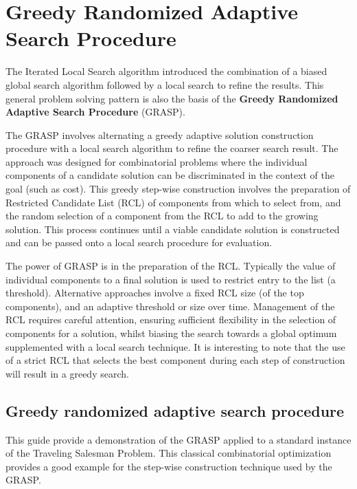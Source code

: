 \section{Greedy Randomized Adaptive Search Procedure}
The Iterated Local Search algorithm introduced the combination of a biased global search algorithm followed by a local search to refine the results. This general problem solving pattern is also the basis of the \textbf{Greedy Randomized Adaptive Search Procedure} (GRASP).

The GRASP involves alternating a greedy adaptive solution construction procedure with a local search algorithm to refine the coarser search result. The approach was designed for combinatorial problems where the individual components of a candidate solution can be discriminated in the context of the goal (such as cost). This greedy step-wise construction involves the preparation of Restricted Candidate List (RCL) of components from which to select from, and the random selection of a component from the RCL to add to the growing solution. This process continues until a viable candidate solution is constructed and can be passed onto a local search procedure for evaluation.

The power of GRASP is in the preparation of the RCL. Typically the value of individual components to a final solution is used to restrict entry to the list (a threshold). Alternative approaches involve a fixed RCL size (of the top components), and an adaptive threshold or size over time. Management of the RCL requires careful attention, ensuring sufficient flexibility in the selection of components for a solution, whilst biasing the search towards a global optimum supplemented with a local search technique. It is interesting to note that the use of a strict RCL that selects the best component during each step of construction will result in a greedy search.

\subsection{Greedy randomized adaptive search procedure}
This guide provide a demonstration of the GRASP applied to a standard instance of the Traveling Salesman Problem. This classical combinatorial optimization provides a good example for the step-wise construction technique used by the GRASP.


